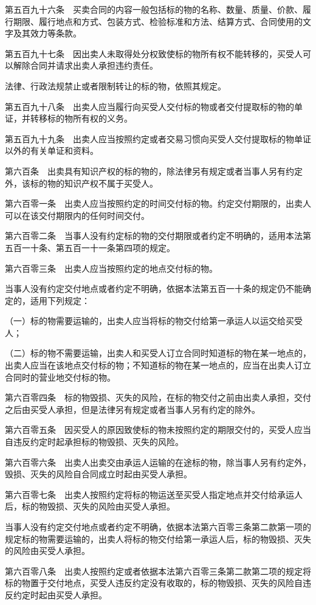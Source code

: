 \documentclass[UTF8,12pt,a4paper]{ctexbook}
\begin{document}
第五百九十六条　买卖合同的内容一般包括标的物的名称、数量、质量、价款、履行期限、履行地点和方式、包装方式、检验标准和方法、结算方式、合同使用的文字及其效力等条款。

第五百九十七条　因出卖人未取得处分权致使标的物所有权不能转移的，买受人可以解除合同并请求出卖人承担违约责任。

法律、行政法规禁止或者限制转让的标的物，依照其规定。

第五百九十八条　出卖人应当履行向买受人交付标的物或者交付提取标的物的单证，并转移标的物所有权的义务。

第五百九十九条　出卖人应当按照约定或者交易习惯向买受人交付提取标的物单证以外的有关单证和资料。

第六百条　出卖具有知识产权的标的物的，除法律另有规定或者当事人另有约定外，该标的物的知识产权不属于买受人。

第六百零一条　出卖人应当按照约定的时间交付标的物。约定交付期限的，出卖人可以在该交付期限内的任何时间交付。

第六百零二条　当事人没有约定标的物的交付期限或者约定不明确的，适用本法第五百一十条、第五百一十一条第四项的规定。

第六百零三条　出卖人应当按照约定的地点交付标的物。

当事人没有约定交付地点或者约定不明确，依据本法第五百一十条的规定仍不能确定的，适用下列规定：

（一）标的物需要运输的，出卖人应当将标的物交付给第一承运人以运交给买受人；

（二）标的物不需要运输，出卖人和买受人订立合同时知道标的物在某一地点的，出卖人应当在该地点交付标的物；不知道标的物在某一地点的，应当在出卖人订立合同时的营业地交付标的物。

第六百零四条　标的物毁损、灭失的风险，在标的物交付之前由出卖人承担，交付之后由买受人承担，但是法律另有规定或者当事人另有约定的除外。

第六百零五条　因买受人的原因致使标的物未按照约定的期限交付的，买受人应当自违反约定时起承担标的物毁损、灭失的风险。

第六百零六条　出卖人出卖交由承运人运输的在途标的物，除当事人另有约定外，毁损、灭失的风险自合同成立时起由买受人承担。

第六百零七条　出卖人按照约定将标的物运送至买受人指定地点并交付给承运人后，标的物毁损、灭失的风险由买受人承担。

当事人没有约定交付地点或者约定不明确，依据本法第六百零三条第二款第一项的规定标的物需要运输的，出卖人将标的物交付给第一承运人后，标的物毁损、灭失的风险由买受人承担。

第六百零八条　出卖人按照约定或者依据本法第六百零三条第二款第二项的规定将标的物置于交付地点，买受人违反约定没有收取的，标的物毁损、灭失的风险自违反约定时起由买受人承担。
\end{document}
